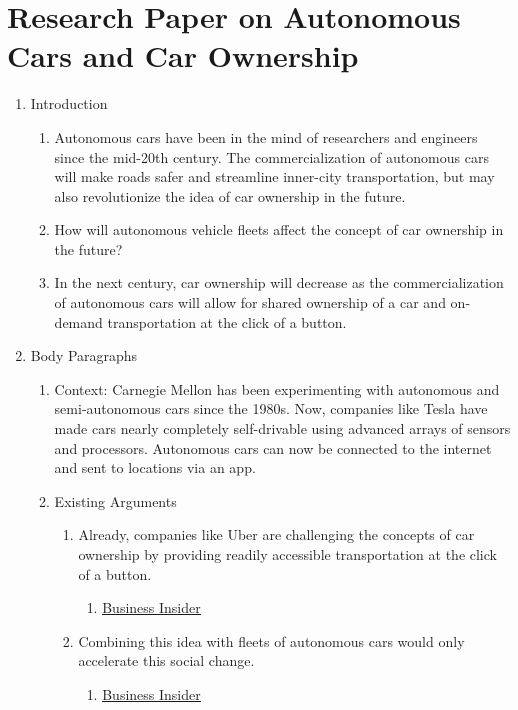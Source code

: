 \documentclass[letterpaper, 12pt]{article}
\begin{document}
\section*{Research Paper on Autonomous Cars and Car Ownership}
\begin{enumerate}
  \item Introduction
  \begin{enumerate}
    \item Autonomous cars have been in the mind of researchers and engineers
      since the mid-20th century. The commercialization of autonomous cars will
      make roads safer and streamline inner-city transportation, but may also
      revolutionize the idea of car ownership in the future.
    \item How will autonomous vehicle fleets affect the concept of car ownership
      in the future?
    \item In the next century, car ownership will decrease as the
      commercialization of autonomous cars will allow for shared ownership of
      a car and on-demand transportation at the click of a button.
  \end{enumerate}
  \item Body Paragraphs
  \begin{enumerate}
    \item Context: Carnegie Mellon has been experimenting with autonomous and
      semi-autonomous cars since the 1980s. Now, companies like Tesla have made
      cars nearly completely self-drivable using advanced arrays of sensors and
      processors. Autonomous cars can now be connected to the internet and sent
      to locations via an app.
    \item Existing Arguments
    \begin{enumerate}
      \item Already, companies like Uber are challenging the concepts of car
        ownership by providing readily accessible transportation at the click
        of a button.
      \begin{enumerate}
        \item \href{http://www.businessinsider.com/ubers-plans-to-be-cheaper-than-owning-a-car-2015-2}{\underline{Business Insider}}
      \end{enumerate}
      \item Combining this idea with fleets of autonomous cars would only
        accelerate this social change.
      \begin{enumerate}
        \item \href{http://www.businessinsider.com/former-tesla-vp-georg-bauer-autonomy-will-kill-car-ownership-2016-11}{\underline{Business Insider}}

\end{enumerate}
\end{enumerate}
\end{enumerate}
\end{enumerate}
\end{document}

